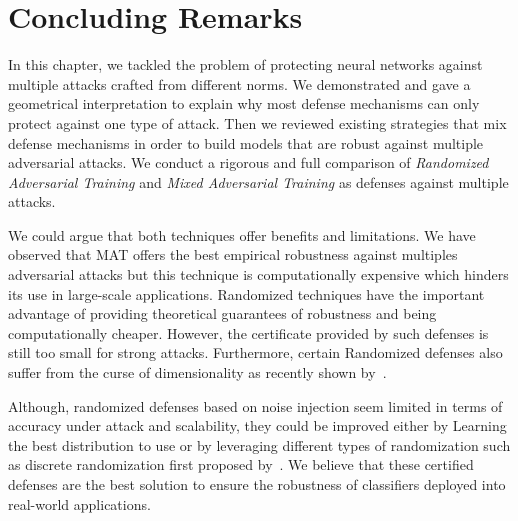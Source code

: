 \section{Concluding Remarks}
\label{section:ap4-conclusion}

In this chapter, we tackled the problem of protecting neural networks against multiple attacks crafted from different norms.
We demonstrated and gave a geometrical interpretation to explain why most defense mechanisms can only protect against one type of attack.
Then we reviewed existing strategies that mix defense mechanisms in order to build models that are robust against multiple adversarial attacks.
We conduct a rigorous and full comparison of \emph{Randomized Adversarial Training} and \emph{Mixed Adversarial Training} as defenses against multiple attacks.

We could argue that both techniques offer benefits and limitations.
We have observed that MAT offers the best empirical robustness against multiples adversarial attacks but this technique is computationally expensive which hinders its use in large-scale applications.
Randomized techniques have the important advantage of providing theoretical guarantees of robustness and being computationally cheaper.
However, the certificate provided by such defenses is still too small for strong attacks.
Furthermore, certain Randomized defenses also suffer from the curse of dimensionality as recently shown by~\citet{kumar2020curse}. 

Although, randomized defenses based on noise injection seem limited in terms of accuracy under attack and scalability, they could be improved either by Learning the best distribution to use or by leveraging different types of randomization such as discrete randomization first proposed by~\citet{pinot2020randomization}.
We believe that these certified defenses are the best solution to ensure the robustness of classifiers deployed into real-world applications.

